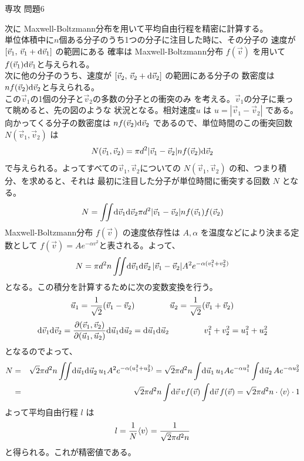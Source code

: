 \documentclass[fleqn]{jbook}
\begin{document}
\begin{answer}{専攻 問題6}{}
\begin{subanswers}
\begin{subsubanswers}
    次に Maxwell-Boltzmann分布を用いて平均自由行程を精密に計算する。\\
%
    単位体積中に$n$個ある分子のうち1つの分子に注目した時に、その分子の
    速度が $[\vec{v}_1,\, \vec{v}_1+{\rm d}\vec{v}_1]$ の範囲にある
    確率は Maxwell-Boltzmann分布 $f(\vec{v})$ を用いて
    $f(\vec{v}_1){\rm d}\vec{v}_1$と与えられる。\\
%
    次に他の分子のうち、速度が
    $[\vec{v}_2,\, \vec{v}_2+{\rm d}\vec{v}_2]$ の範囲にある分子の
    数密度は $n f(\vec{v}_2){\rm d}\vec{v}_2$と与えられる。\\
%
    この$\vec{v}_1$の1個の分子と$\vec{v}_2$の多数の分子との衝突のみ
    を考える。$\vec{v}_1$の分子に乗って眺めると、先の図のような
    状況となる。相対速度$u$ は $u=|\vec{v}_1-\vec{v}_2|$ である。
    向かってくる分子の数密度は $n f(\vec{v}_2){\rm d}\vec{v}_2$
    であるので、単位時間のこの衝突回数 $N(\vec{v}_1,\vec{v}_2)$ は
%
    \[ N(\vec{v}_1,\vec{v}_2)%
       = \pi d^2 |\vec{v}_1-\vec{v}_2| n f(\vec{v}_2)\d{\vec{v}_2} \]
%
    で与えられる。よってすべての$\vec{v}_1,\vec{v}_2$についての
    $N(\vec{v}_1,\vec{v}_2)$ の和、つまり積分、を求めると、それは
    最初に注目した分子が単位時間に衝突する回数 $N$ となる。
%
    \[ N = \int\!\!\!\int\! \d{\vec{v}_1}\d{\vec{v}_2}%
         \pi d^2 |\vec{v}_1-\vec{v}_2| n f(\vec{v}_1)f(\vec{v}_2) \]
%
    Maxwell-Boltzmann分布 $f(\vec{v})$ の速度依存性は
    $A, \alpha$ を温度などにより決まる定数として
    $f(\vec{v}) = A e^{-\alpha v^2}$と表される。よって、
%
    \[ N=\pi d^2n \int\!\!\!\int\! \d{\vec{v}_1}\d{\vec{v}_2}\,%
         |\vec{v}_1-\vec{v}_2| A^2 e^{-\alpha(v_1^2+v_2^2)} \]
%   
    となる。この積分を計算するために次の変数変換を行う。
%
    \[ \vec{u}_1 = \frac{1}{\sqrt{2}}(\vec{v}_1-\vec{v}_2)%
         \hspace{15mm} %
       \vec{u}_2 = \frac{1}{\sqrt{2}}(\vec{v}_1+\vec{v}_2) \]
%
    \[ \d{\vec{v}_1}\d{\vec{v}_2}%
       = \frac{\partial(\vec{v}_1,\vec{v}_2)}{\partial(\vec{u}_1,\vec{u}_2)}%
         \d{\vec{u}_1}\d{\vec{u}_2}%
       = \d{\vec{u}_1}\d{\vec{u}_2} \hspace{15mm}%
       v_1^2+v_2^2 = u_1^2 + u_2^2 \]
%
    となるのでよって、
%
    \begin{eqnarray*}
     N &=& \sqrt{2}\pi d^2 n%
           \int\!\!\!\int\! \d{\vec{u}_1}\d{\vec{u}_2}\,%
           u_1 A^2 e^{-\alpha(u_1^2+u_2^2)}%
        =  \sqrt{2}\pi d^2 n%
           \int\!\d{\vec{u}_1}\, u_1 A e^{-\alpha u_1^2}%
           \int\!\d{\vec{u}_2}\,     A e^{-\alpha u_2^2} \\
       &=& \sqrt{2}\pi d^2 n%
           \int\!\d{\vec{v}}\, v f(\vec{v})%
           \int\!\d{\vec{v}}\,   f(\vec{v})%
        =  \sqrt{2}\pi d^2 n \cdot \Mean{v} \cdot 1
    \end{eqnarray*}
%
    よって平均自由行程 $l$ は
%
    \[ l = \frac{1}{N} \langle{v}\rangle = \frac{1}{\sqrt{2}\pi d^2 n} \]
%
    と得られる。これが精密値である。


\end{subsubanswers}
\end{subanswers}
\end{answer}
\end{document}
